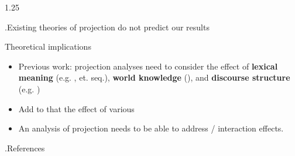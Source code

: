 \documentclass[final, table, cmyk]{beamer}
\newlength{\colwidth}
\newlength{\vboxsep}
\begin{document}
\begin{frame}[t]
\begin{columns}[t]
\begin{column}{1.25\colwidth}
\begin{normalbox}{\phantom.\hfill Existing theories of projection do not predict our results}
			\end{normalbox}

			\vspace{\vboxsep}
			\begin{upshotbox}{Theoretical implications}
				\begin{itemize}
					\item Previous work: projection analyses need to consider the effect of \textbf{lexical meaning} (e.g. \citealt{kiparsky_fact_1970,karttunen_observations_1971}, et. seq.), \textbf{world knowledge} (\citealt{de_marneffe_did_2012,degen_prior_2021}), and \textbf{discourse structure} (e.g. \citealt{simons_best_2017,tonhauser_how_2018})
					
					\item Add to that the effect of various 
					
					\item An analysis of projection needs to be able to address  /  interaction effects.

				\end{itemize}
			\end{upshotbox}

			\vspace{\vboxsep}
			\begin{normalbox}{\phantom.\hfill References}
				\tiny
				

\end{normalbox}
\end{column}
\end{columns}
\end{frame}
\end{document}
